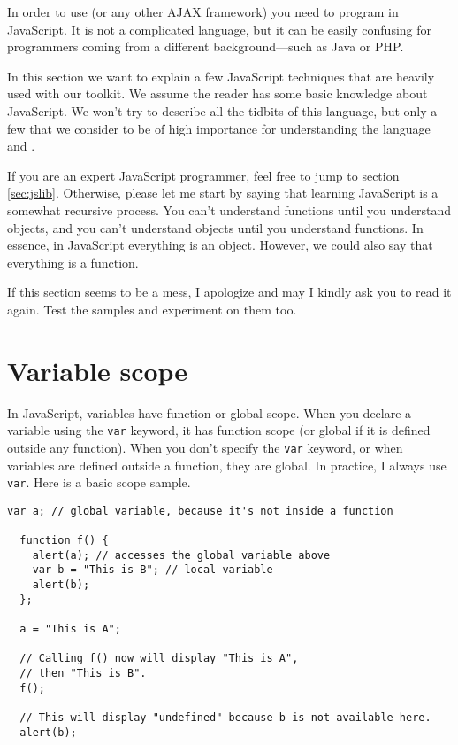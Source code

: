 
In order to use \TheLibName{} (or any other AJAX framework) you need to program
in JavaScript.  It is not a complicated language, but it can be easily
confusing for programmers coming from a different background—such as Java or
PHP.

In this section we want to explain a few JavaScript techniques that are heavily
used with our toolkit.  We assume the reader has some basic knowledge about
JavaScript.  We won't try to describe all the tidbits of this language, but
only a few that we consider to be of high importance for understanding the
language and \TheLibName.

If you are an expert JavaScript programmer, feel free to jump to section
\ref{sec:jslib}.  Otherwise, please let me start by saying that learning
JavaScript is a somewhat recursive process.  You can't understand functions
until you understand objects, and you can't understand objects until you
understand functions.  In essence, in JavaScript everything is an object.
However, we could also say that everything is a function.

If this section seems to be a mess, I apologize and may I kindly ask you to
read it again.  Test the samples and experiment on them too.

\section{Variable scope}

In JavaScript, variables have function or global scope.  When you declare a
variable using the \lstinline{var} keyword, it has function scope (or global
if it is defined outside any function).  When you don't specify the
\lstinline{var} keyword, or when variables are defined outside a function,
they are global.  In practice, I always use \lstinline{var}.  Here is a basic
scope sample.

\begin{lstlisting}[nolol]
  var a; // global variable, because it's not inside a function

  function f() {
    alert(a); // accesses the global variable above
    var b = "This is B"; // local variable
    alert(b);
  };

  a = "This is A";

  // Calling f() now will display "This is A",
  // then "This is B".
  f();

  // This will display "undefined" because b is not available here.
  alert(b);
\end{lstlisting}

